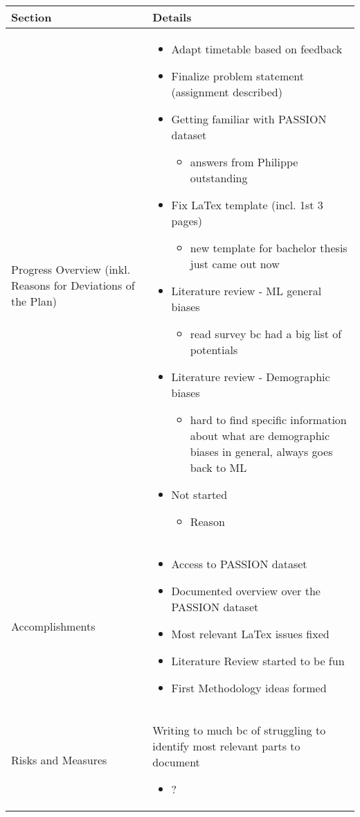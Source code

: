 \documentclass[a4paper,11pt]{article}
\newcommand{\done}{\textcolor{green}{\ding{52}}}
\newcommand{\ongoing}{\textcolor{orange}{\ding{45}}}
\newcommand{\notstarted}{\textcolor{red}{\ding{56}}}
\begin{document}
	
	\renewcommand{\arraystretch}{1.5}
	\begin{longtable}{|p{4cm}|p{10cm}|}
		\hline
		\textbf{Section} & \textbf{Details} \\
		\hline
		Progress Overview (inkl. Reasons for Deviations of the Plan) & \begin{itemize}
			\item[\done] Adapt timetable based on feedback
			\item[\ongoing] Finalize problem statement (assignment described)
			\item[\ongoing] Getting familiar with PASSION dataset
			\begin{itemize}
				\item answers from Philippe outstanding
			\end{itemize}
			\item[\ongoing] Fix LaTex template (incl. 1st 3 pages)
			\begin{itemize}
				\item new template for bachelor thesis just came out now
			\end{itemize}
			\item[\ongoing] Literature review - ML general biases
			\begin{itemize}
				\item read survey bc had a big list of potentials
			\end{itemize}
			\item[\ongoing] Literature review - Demographic biases
			\begin{itemize}
				\item hard to find specific information about what are demographic biases in general, always goes back to ML
			\end{itemize}
			
			\item[\notstarted] Not started
			\begin{itemize}
				\item Reason
			\end{itemize}
		\end{itemize} \\
		\hline
		Accomplishments & \begin{itemize}
			\item[\done] Access to PASSION dataset
			\item[\done] Documented overview over the PASSION dataset
			\item[\done] Most relevant LaTex issues fixed
			\item[\done] Literature Review started to be fun
			\item[\done] First Methodology ideas formed
		\end{itemize} \\
		\hline
		Risks and Measures & 
		Writing to much bc of struggling to identify most relevant parts to document
		\begin{itemize}
			\item ?
		\end{itemize}
		

\end{longtable}
\end{document}
